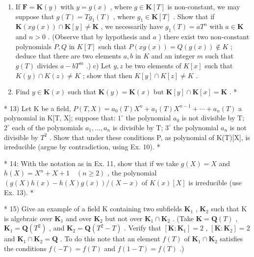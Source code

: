\begin{enumerate}
\def\labelenumi{\alph{enumi})}
\setcounter{enumi}{1}
\item
  If \(\mathbf{F} = \mathbf{K}(y)\) with \(y = g(x)\) , where \(g \in \mathbf{K}[T]\) is non-constant, we may suppose that \(g(T) = Tg_1(T)\) , where \(g_1 \in \mathbf{K}[T]\) . Show that if \(\mathbf{K}(xg(x)) \cap \mathbf{K}[y] \neq \mathbf{K}\) , we necessarily have \(g_1(T) = aT^n\) with \(a \in \mathbf{K}\) and \(n > 0\) . (Observe that by hypothesis and \(a\) ) there exist two non-constant polynomials \(P, Q\) in \(K[T]\) such that \(P(xg(x)) = Q(g(x)) \notin K\) ; deduce that there are two elements \(a, b\) in \(K\) and an integer \(m\) such that \(g(T)\) divides \(a - bT^m\) .) c) Let \(y, z\) be two elements of \(K[x]\) such that \(K(y) \cap K(z) \neq K\) ; show that then \(K[y] \cap K[z] \neq K\) .
\item
  Find \(y \in \mathbf{K}(x)\) such that \(\mathbf{K}(y) = \mathbf{K}(x)\) but \(\mathbf{K}[y] \cap \mathbf{K}[x] = \mathbf{K}\) . *
\end{enumerate}

* 13) Let K be a field, \(P(T, X) = a_0(T)X^n + a_1(T)X^{n-1} + \cdots + a_n(T)\) a polynomial in K{[}T, X{]}; suppose that: \(1^\circ\) the polynomial \(a_0\) is not divisible by T; \(2^\circ\) each of the polynomials \(a_1, \ldots, a_n\) is divisible by T; \(3^\circ\) the polynomial \(a_n\) is not divisible by \(T^2\) . Show that under these conditions P, as polynomial of K(T){[}X{]}, is irreducible (argue by contradiction, using Ex. 10). *

* 14: With the notation as in Ex. 11, show that if we take \(g(X) = X\) and \(h(X) = X^n + X + 1 \quad (n \geqslant 2)\) , the polynomial \((g(X)h(x) - h(X)g(x)) / (X - x)\) of \(K(x)[X]\) is irreducible (use Ex. 13). *

* 15) Give an example of a field K containing two subfields \(\mathbf{K}_1\) , \(\mathbf{K}_2\) such that K is algebraic over \(\mathbf{K}_1\) and over \(\mathbf{K}_2\) but not over \(\mathbf{K}_1 \cap \mathbf{K}_2\) . (Take \(\mathbf{K} = \mathbf{Q}(T)\) , \(\mathbf{K}_1 = \mathbf{Q}(T^2)\) , and \(\mathbf{K}_2 = \mathbf{Q}(T^2 - T)\) . Verify that \([\mathbf{K} : \mathbf{K}_1] = 2\) , \([\mathbf{K} : \mathbf{K}_2] = 2\) and \(\mathbf{K}_1 \cap \mathbf{K}_2 = \mathbf{Q}\) . To do this note that an element \(f(T)\) of \(\mathbf{K}_1 \cap \mathbf{K}_2\) satisfies the conditions \(f(-T) = f(T)\) and \(f(1 - T) = f(T)\) .)

